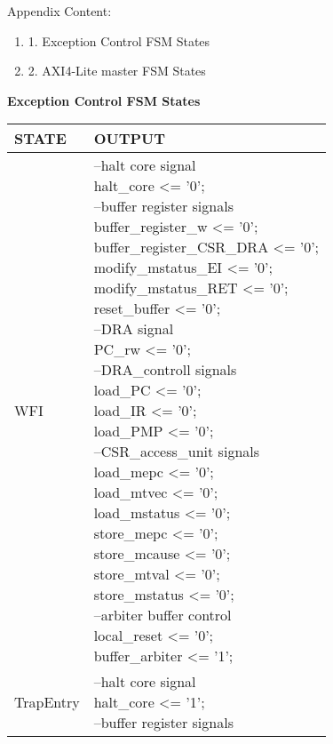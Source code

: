 
\addchap{\appendixPhrase}
{\LARGE Appendix Content:
\begin{enumerate}
	\item 1. Exception Control FSM States
	\item 2. AXI4-Lite master FSM States
\end{enumerate}}
\clearpage
{\LARGE \textbf{Exception Control FSM States}}
\begin{small}
\begin{longtable}{| p{} | p{} |}
		\hline
		\rowcolor{light-gray}
		\textbf{STATE} & \textbf{OUTPUT} \\
		\hline
		WFI & \makecell{--halt core signal\\
		halt\_core <= '0';\\
		--buffer register signals\\
		buffer\_register\_w <= '0';\\
		buffer\_register\_CSR\_DRA <= '0';\\
		modify\_mstatus\_EI <= '0';\\
		modify\_mstatus\_RET <= '0';\\
		reset\_buffer <= '0';\\
		--DRA signal\\
		PC\_rw <= '0';\\
		--DRA\_controll signals\\
		load\_PC <= '0';\\
		load\_IR <= '0';\\
		load\_PMP <= '0';\\
		--CSR\_access\_unit signals\\
		load\_mepc <= '0';\\
		load\_mtvec <= '0';\\
		load\_mstatus <= '0';\\
		store\_mepc <= '0';\\
		store\_mcause <= '0';\\
		store\_mtval <= '0';\\
		store\_mstatus <= '0';\\
		--arbiter buffer control\\
		local\_reset <= '0';\\
		buffer\_arbiter <= '1';}\\
		\hline
				TrapEntry & \makecell{--halt core signal\\
			halt\_core <= '1';\\
			--buffer register signals\\
}
\end{longtable}
\end{small}
